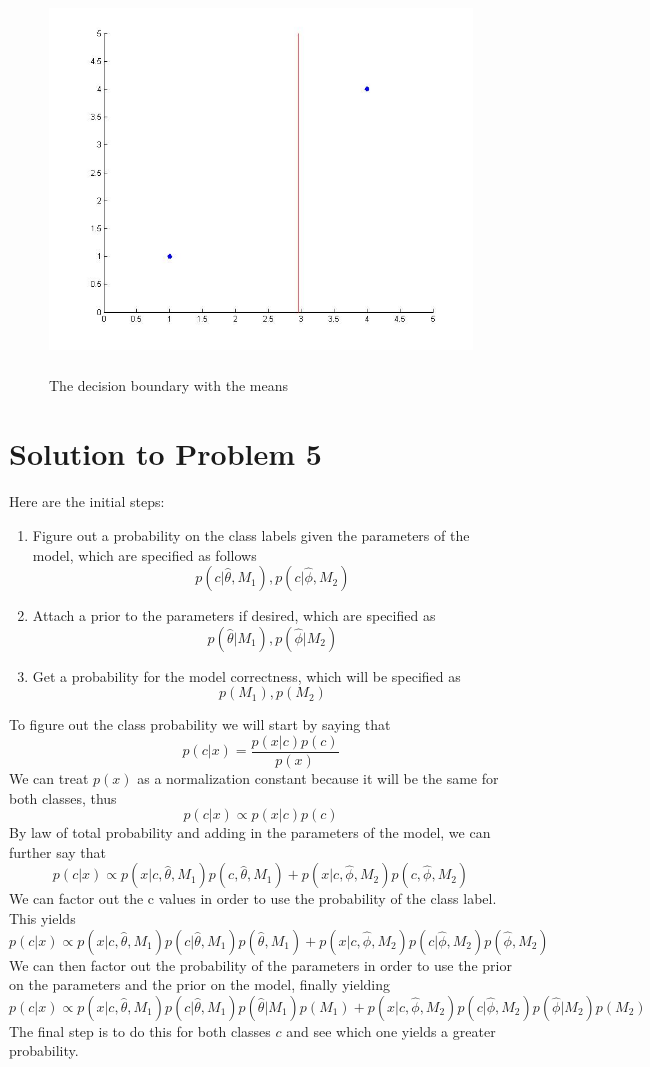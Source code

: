 \documentclass[11pt,psfig]{article}
\begin{document}
\begin{figure}[H]
\centering
\includegraphics[height=4in]{plot4_part2.jpg}
\caption{The decision boundary with the means}
\end{figure}

\newpage

\section*{Solution to Problem 5}

Here are the initial steps:
\begin{enumerate}
\item Figure out a probability on the class labels given the parameters of the model, which are specified as follows
\[
p(c|\hat{\theta},M_1),p(c|\hat{\phi},M_2)
\]
\item Attach a prior to the parameters if desired, which are specified as
\[
p(\hat{\theta}|M_1),p(\hat{\phi}|M_2)
\]
\item Get a probability for the model correctness, which will be specified as
\[
p(M_1),p(M_2)
\]
\end{enumerate}
To figure out the class probability we will start by saying that
\[
p(c|x) = \frac{p(x|c)p(c)}{p(x)}
\]
We can treat $p(x)$ as a normalization constant because it will be the same for both classes, thus
\[
p(c|x) \propto p(x|c)p(c)
\]
By law of total probability and adding in the parameters of the model, we can further say that
\[
p(c|x) \propto p(x|c,\hat{\theta},M_1)p(c,\hat{\theta},M_1) + p(x|c,\hat{\phi},M_2)p(c,\hat{\phi},M_2)
\]
We can factor out the c values in order to use the probability of the class label. This yields 
\[
p(c|x) \propto p(x|c,\hat{\theta},M_1)p(c|\hat{\theta},M_1)p(\hat{\theta},M_1) + p(x|c,\hat{\phi},M_2)p(c|\hat{\phi},M_2)p(\hat{\phi},M_2)
\]
We can then factor out the probability of the parameters in order to use the prior on the parameters and the prior on the model, finally yielding
\[
p(c|x) \propto p(x|c,\hat{\theta},M_1)p(c|\hat{\theta},M_1)p(\hat{\theta}|M_1)p(M_1) + p(x|c,\hat{\phi},M_2)p(c|\hat{\phi},M_2)p(\hat{\phi}|M_2)p(M_2)
\]
The final step is to do this for both classes $c$ and see which one yields a greater probability. 
\end{document}
